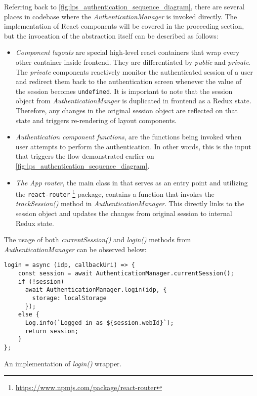 Referring back to \autoref{fig:lps_authentication_sequence_diagram}, there are several places in \lpa{} codebase where the \textit{AuthenticationManager} is invoked directly. The implementation of React components will be covered in the proceeding section, but the invocation of the abstraction itself can be described as follows:
\begin{itemize}
    \item \textit{Component layouts} are special high-level react containers that wrap every other container inside \lpa{} frontend. They are differentiated by \textit{public} and \textit{private}. The \textit{private} components reactively monitor the authenticated session of a user and redirect them back to the authentication screen whenever the value of the session becomes \texttt{undefined}. It is important to note that the session object from \textit{AuthenticationManger} is duplicated in \lpa{} frontend as a Redux state. Therefore, any changes in the original session object are reflected on that state and triggers re-rendering of layout components. 
    \item \textit{Authentication component functions}, are the functions being invoked when user attempts to perform the authentication. In other words, this is the input that triggers the flow demonstrated earlier on \autoref{fig:lps_authentication_sequence_diagram}.
    \item \textit{The App router}, the main class in \lpa{} that serves as an entry point and utilizing the \texttt{react-router} \footnote{\url{https://www.npmjs.com/package/react-router}} package, contains a function that invokes the \textit{trackSession()} method in \textit{AuthenticationManager}. This directly links to the session object and updates the changes from original session to internal Redux state.
\end{itemize}

The usage of both \textit{currentSession()} and \textit{login()} methods from \textit{AuthenticationManager} can be observed below:

\begin{listing}[H]    
\begin{verbatim}
login = async (idp, callbackUri) => {
    const session = await AuthenticationManager.currentSession();
    if (!session)
      await AuthenticationManager.login(idp, {
        storage: localStorage
      });
    else {
      Log.info(`Logged in as ${session.webId}`);
      return session;
    }
};
\end{verbatim}
\caption{An implementation of \textit{login()} wrapper.} 
\label{lst:lpas_login_wrapper}
\end{listing}


